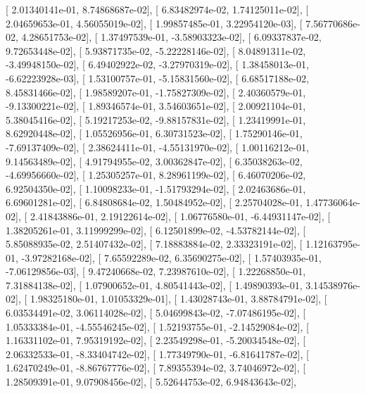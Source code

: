 \documentclass{article}
\begin{document}
       [  2.01340141e-01,   8.74868687e-02],
       [  6.83482974e-02,   1.74125011e-02],
       [  2.04659653e-01,   4.56055019e-02],
       [  1.99857485e-01,   3.22954120e-03],
       [  7.56770686e-02,   4.28651753e-02],
       [  1.37497539e-01,  -3.58903323e-02],
       [  6.09337837e-02,   9.72653448e-02],
       [  5.93871735e-02,  -5.22228146e-02],
       [  8.04891311e-02,  -3.49948150e-02],
       [  6.49402922e-02,  -3.27970319e-02],
       [  1.38458013e-01,  -6.62223928e-03],
       [  1.53100757e-01,  -5.15831560e-02],
       [  6.68517188e-02,   8.45831466e-02],
       [  1.98589207e-01,  -1.75827309e-02],
       [  2.40360579e-01,  -9.13300221e-02],
       [  1.89346574e-01,   3.54603651e-02],
       [  2.00921104e-01,   5.38045416e-02],
       [  5.19217253e-02,  -9.88157831e-02],
       [  1.23419991e-01,   8.62920448e-02],
       [  1.05526956e-01,   6.30731523e-02],
       [  1.75290146e-01,  -7.69137409e-02],
       [  2.38624411e-01,  -4.55131970e-02],
       [  1.00116212e-01,   9.14563489e-02],
       [  4.91794955e-02,   3.00362847e-02],
       [  6.35038263e-02,  -4.69956660e-02],
       [  1.25305257e-01,   8.28961199e-02],
       [  6.46070206e-02,   6.92504350e-02],
       [  1.10098233e-01,  -1.51793294e-02],
       [  2.02463686e-01,   6.69601281e-02],
       [  6.84808684e-02,   1.50484952e-02],
       [  2.25704028e-01,   1.47736064e-02],
       [  2.41843886e-01,   2.19122614e-02],
       [  1.06776580e-01,  -6.44931147e-02],
       [  1.38205261e-01,   3.11999299e-02],
       [  6.12501899e-02,  -4.53782144e-02],
       [  5.85088935e-02,   2.51407432e-02],
       [  7.18883884e-02,   2.33323191e-02],
       [  1.12163795e-01,  -3.97282168e-02],
       [  7.65592289e-02,   6.35690275e-02],
       [  1.57403935e-01,  -7.06129856e-03],
       [  9.47240668e-02,   7.23987610e-02],
       [  1.22268850e-01,   7.31884138e-02],
       [  1.07900652e-01,   4.80541443e-02],
       [  1.49890393e-01,   3.14538976e-02],
       [  1.98325180e-01,   1.01053329e-01],
       [  1.43028743e-01,   3.88784791e-02],
       [  6.03534491e-02,   3.06114028e-02],
       [  5.04699843e-02,  -7.07486195e-02],
       [  1.05333384e-01,  -4.55546245e-02],
       [  1.52193755e-01,  -2.14529084e-02],
       [  1.16331102e-01,   7.95319192e-02],
       [  2.23549298e-01,  -5.20034548e-02],
       [  2.06332533e-01,  -8.33404742e-02],
       [  1.77349790e-01,  -6.81641787e-02],
       [  1.62470249e-01,  -8.86767776e-02],
       [  7.89355394e-02,   3.74046972e-02],
       [  1.28509391e-01,   9.07908456e-02],
       [  5.52644753e-02,   6.94843643e-02],
\end{document}
